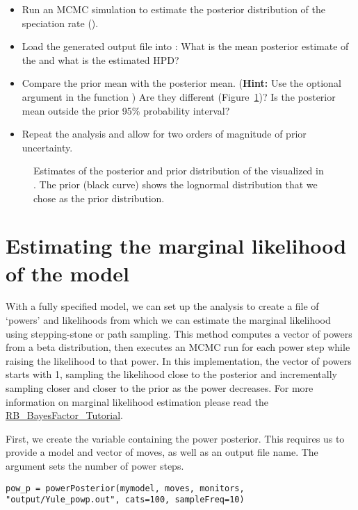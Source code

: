 \begin{itemize}
\item Run an MCMC simulation to estimate the posterior distribution of the speciation rate ().
\item Load the generated output file into \Tracer: What is the mean posterior estimate of the  and what is the estimated HPD?
\item Compare the prior mean with the posterior mean. (\textbf{Hint:} Use the optional argument  in the function ) Are they different (\EG Figure~\ref{fig:prior_posterior})? Is the posterior mean outside the prior 95\% probability interval?
\item Repeat the analysis and allow for two orders of magnitude of prior uncertainty.
\end{itemize}
\begin{figure}[h!]
\centering
{}
\caption{\small Estimates of the posterior and prior distribution of the  visualized in \Tracer. The prior (black curve) shows the lognormal distribution that we chose as the prior distribution.}
\label{fig:prior_posterior}
\end{figure}


\section{Estimating the marginal likelihood of the model}

With a fully specified model, we can set up the  analysis to create a file of `powers' and likelihoods from which we can estimate the marginal likelihood using stepping-stone or path sampling.
This method computes a vector of powers from a beta distribution, then executes an MCMC run for each power step while raising the likelihood to that power. In this implementation, the vector of powers starts with 1, sampling the likelihood close to the posterior and incrementally sampling closer and closer to the prior as the power decreases.
For more information on marginal likelihood estimation please read the \href{https://github.com/revbayes/revbayes_tutorial/raw/master/tutorial_TeX/RB_BayesFactor_Tutorial/RB_BayesFactor_Tutorial.pdf}{RB\_BayesFactor\_Tutorial}.

First, we create the variable containing the power posterior.
This requires us to provide a model and vector of moves, as well as an output file name.
The  argument sets the number of power steps.
{\tt \begin{snugshade*}
\begin{lstlisting}
pow_p = powerPosterior(mymodel, moves, monitors, "output/Yule_powp.out", cats=100, sampleFreq=10)
\end{lstlisting}
\end{snugshade*}}

